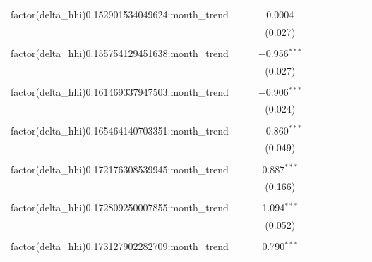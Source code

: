 \begin{table}[H]
{\begin{tabular}{@{\extracolsep{5pt}}lccccccccc}
  factor(delta\_hhi)0.152901534049624:month\_trend &  &  & 0.0004 &  &  &  &  &  &  \\  

   &  &  & (0.027) &  &  &  &  &  &  \\  

   & & & & & & & & & \\  

  factor(delta\_hhi)0.155754129451638:month\_trend &  &  & $-$0.956$^{***}$ &  &  &  &  &  &  \\  

   &  &  & (0.027) &  &  &  &  &  &  \\  

   & & & & & & & & & \\  

  factor(delta\_hhi)0.161469337947503:month\_trend &  &  & $-$0.906$^{***}$ &  &  &  &  &  &  \\  

   &  &  & (0.024) &  &  &  &  &  &  \\  

   & & & & & & & & & \\  

  factor(delta\_hhi)0.165464140703351:month\_trend &  &  & $-$0.860$^{***}$ &  &  &  &  &  &  \\  

   &  &  & (0.049) &  &  &  &  &  &  \\  

   & & & & & & & & & \\  

  factor(delta\_hhi)0.172176308539945:month\_trend &  &  & 0.887$^{***}$ &  &  &  &  &  &  \\  

   &  &  & (0.166) &  &  &  &  &  &  \\  

   & & & & & & & & & \\  

  factor(delta\_hhi)0.172809250007855:month\_trend &  &  & 1.094$^{***}$ &  &  &  &  &  &  \\  

   &  &  & (0.052) &  &  &  &  &  &  \\  

   & & & & & & & & & \\  

  factor(delta\_hhi)0.173127902282709:month\_trend &  &  & 0.790$^{***}$ &  &  &  &  &  &  \\  


\end{tabular}}
\end{table}
